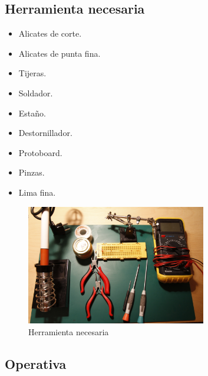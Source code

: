 	\subsection{Herramienta necesaria}
		\begin{itemize}
			\item Alicates de corte.
			\item Alicates de punta fina.
			\item Tijeras.
			\item Soldador.
			\item Estaño.
			\item Destornillador.
			\item Protoboard.
			\item Pinzas.	
			\item Lima fina.
		\end{itemize}
		\begin{figure}[!htp]
			\centering
			\includegraphics[width=0.7\textwidth]{../../Fotos/8.jpg}
			\caption{Herramienta necesaria}
		\end{figure}
		\newpage{}
	\subsection{Operativa}
